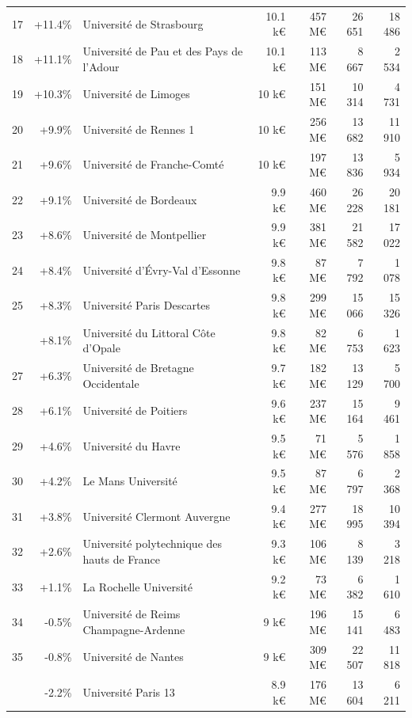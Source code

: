 \documentclass[12pt,french,]{article}
\begin{document}
\begin{longtable}{rrlrrrr}
\rowcolor{gray!6}  17 & +11.4\% & Université de Strasbourg & 10.1 k€ & 457 M€ & 26 651 & 18 486\\
18 & +11.1\% & Université de Pau et des Pays de l'Adour & 10.1 k€ & 113 M€ & 8 667 & 2 534\\
\rowcolor{gray!6}  19 & +10.3\% & Université de Limoges & 10 k€ & 151 M€ & 10 314 & 4 731\\
20 & +9.9\% & Université de Rennes 1 & 10 k€ & 256 M€ & 13 682 & 11 910\\
\addlinespace
\rowcolor{gray!6}  21 & +9.6\% & Université de Franche-Comté & 10 k€ & 197 M€ & 13 836 & 5 934\\
22 & +9.1\% & Université de Bordeaux & 9.9 k€ & 460 M€ & 26 228 & 20 181\\
\rowcolor{gray!6}  23 & +8.6\% & Université de Montpellier & 9.9 k€ & 381 M€ & 21 582 & 17 022\\
24 & +8.4\% & Université d'Évry-Val d'Essonne & 9.8 k€ & 87 M€ & 7 792 & 1 078\\
\rowcolor{gray!6}  25 & +8.3\% & Université Paris Descartes & 9.8 k€ & 299 M€ & 15 066 & 15 326\\
\addlinespace
26 & +8.1\% & Université du Littoral Côte d'Opale & 9.8 k€ & 82 M€ & 6 753 & 1 623\\
\rowcolor{gray!6}  27 & +6.3\% & Université de Bretagne Occidentale & 9.7 k€ & 182 M€ & 13 129 & 5 700\\
28 & +6.1\% & Université de Poitiers & 9.6 k€ & 237 M€ & 15 164 & 9 461\\
\rowcolor{gray!6}  29 & +4.6\% & Université du Havre & 9.5 k€ & 71 M€ & 5 576 & 1 858\\
30 & +4.2\% & Le Mans Université & 9.5 k€ & 87 M€ & 6 797 & 2 368\\
\addlinespace
\rowcolor{gray!6}  31 & +3.8\% & Université Clermont Auvergne & 9.4 k€ & 277 M€ & 18 995 & 10 394\\
32 & +2.6\% & Université polytechnique des hauts de France & 9.3 k€ & 106 M€ & 8 139 & 3 218\\
\rowcolor{gray!6}  33 & +1.1\% & La Rochelle Université & 9.2 k€ & 73 M€ & 6 382 & 1 610\\
34 & -0.5\% & Université de Reims Champagne-Ardenne & 9 k€ & 196 M€ & 15 141 & 6 483\\
\rowcolor{gray!6}  35 & -0.8\% & Université de Nantes & 9 k€ & 309 M€ & 22 507 & 11 818\\
\addlinespace
36 & -2.2\% & Université Paris 13 & 8.9 k€ & 176 M€ & 13 604 & 6 211\\

\end{longtable}
\end{document}
